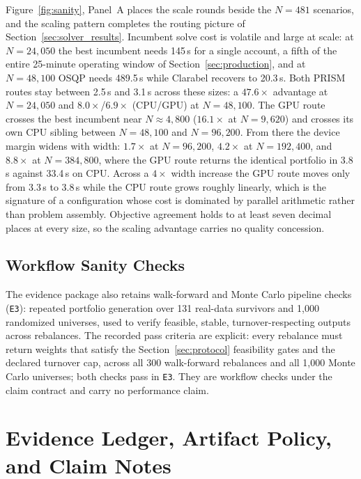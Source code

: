 \documentclass[10pt,a4paper]{extarticle}
\begin{document}
Figure~\ref{fig:sanity}, Panel~A places the scale rounds beside the
$N{=}481$ scenarios, and the scaling pattern completes the routing picture of
Section~\ref{sec:solver_results}. Incumbent solve cost is volatile and large
at scale: at $N{=}24{,}050$ the best incumbent needs 145\,s for a single
account, a fifth of the entire 25-minute operating window of
Section~\ref{sec:production}, and at $N{=}48{,}100$ OSQP needs 489.5\,s
while Clarabel recovers to 20.3\,s. Both PRISM routes stay between 2.5\,s
and 3.1\,s across these sizes: a $47.6\times$ advantage at $N{=}24{,}050$ and
$8.0\times$/$6.9\times$ (CPU/GPU) at $N{=}48{,}100$. The GPU route crosses
the best incumbent near $N{\approx}4{,}800$ ($16.1\times$ at $N{=}9{,}620$)
and crosses its own CPU sibling between $N{=}48{,}100$ and $N{=}96{,}200$. From there the
device margin widens with width: $1.7\times$ at $N{=}96{,}200$,
$4.2\times$ at $N{=}192{,}400$, and $8.8\times$ at $N{=}384{,}800$, where
the GPU route returns the identical portfolio in 3.8\,s against 33.4\,s on
CPU. Across a $4\times$ width increase the GPU route moves only from
3.3\,s to 3.8\,s while the CPU route grows roughly linearly, which is the
signature of a configuration whose cost is dominated by parallel arithmetic
rather than problem assembly. Objective agreement holds to at least seven
decimal places at every size, so the scaling advantage carries no quality
concession.

\subsection{Workflow Sanity Checks}

The evidence package also retains walk-forward and Monte Carlo pipeline
checks (\texttt{E3}): repeated portfolio generation over 131 real-data
survivors and 1{,}000 randomized universes, used to verify feasible, stable,
turnover-respecting outputs across rebalances. The recorded pass criteria
are explicit: every rebalance must return weights that satisfy the
Section~\ref{sec:protocol} feasibility gates and the declared turnover cap,
across all 300 walk-forward rebalances and all 1{,}000 Monte Carlo universes;
both checks pass in \texttt{E3}. They are workflow checks under the claim
contract and carry no performance claim.

\section{Evidence Ledger, Artifact Policy, and Claim Notes}
\label{sec:evidence}
\end{document}
